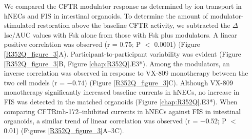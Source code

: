 We compared the CFTR modulator response as determined by ion transport in hNECs and FIS in intestinal organoids. To determine the amount of modulator-stimulated restoration above the baseline CFTR activity, we subtracted the $\Delta$Isc/AUC values with Fsk alone from those with Fsk plus modulators. A linear positive correlation was observed (r = 0.75; P $<$ 0.0001) (Figure \ref{R352Q_figure_3}A). Participant-to-participant variability was evident (Figure \ref{R352Q_figure_3}B, Figure \ref{chap:R352Q}.E3*). Among the modulators, an inverse correlation was observed in response to VX-809 monotherapy between the two cell models (r = −0.74) (Figure \ref{R352Q_figure_3}C). Although VX-809 monotherapy significantly increased baseline currents in hNECs, no increase in FIS was detected in the matched organoids (Figure \ref{chap:R352Q}.E3*). When comparing CFTRinh-172–inhibited currents in hNECs against FIS in intestinal organoids, a similar trend of linear correlation was observed (r = −0.52; P $<$ 0.01) (Figures \ref{R352Q_figure_3}A–3C).

